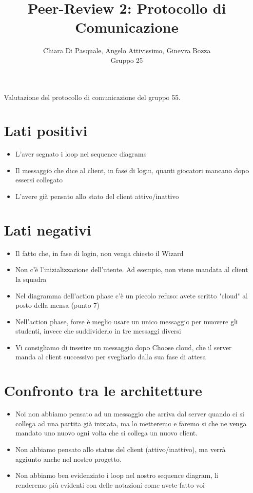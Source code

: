 \documentclass[12pt]{article}
\title{Peer-Review 2: Protocollo di Comunicazione}
\author{Chiara Di Pasquale, Angelo Attivissimo, Ginevra Bozza\\Gruppo 25}
\begin{document}
\maketitle

Valutazione del protocollo di comunicazione del gruppo 55.

\section{Lati positivi}
\begin{itemize}

\item L'aver segnato i loop nei sequence diagrams
\item Il messaggio che dice al client, in fase di login, quanti giocatori mancano dopo essersi collegato 
\item L'avere già pensato allo stato del client attivo/inattivo
\end{itemize}

\section{Lati negativi}
\begin{itemize}
\item Il fatto che, in fase di login, non venga chiesto il Wizard
\item Non c'è l'inizializzazione dell'utente. Ad esempio, non viene mandata al client la squadra
\item Nel diagramma dell'action phase c'è un piccolo refuso: avete scritto "cloud" al posto della mensa (punto 7)
\item Nell'action phase, forse è meglio usare un unico messaggio per muovere gli studenti, invece che suddividerlo in tre messaggi diversi
\item Vi consigliamo di inserire un messaggio dopo Choose cloud, che il server manda al client successivo per svegliarlo dalla sua fase di attesa
\end{itemize}

\section{Confronto tra le architetture}
\begin{itemize}
\item Noi non abbiamo pensato ad un messaggio che arriva dal server quando ci si collega ad una partita già iniziata, ma lo metteremo e faremo si che ne venga mandato uno nuovo ogni volta che si collega un nuovo client.
\item Non abbiamo pensato allo status del client (attivo/inattivo), ma verrà aggiunto anche nel nostro progetto.
\item Non abbiamo ben evidenziato i loop nel nostro sequence diagram, li renderemo più evidenti con delle notazioni come avete fatto voi
\end{itemize}
\end{document}
